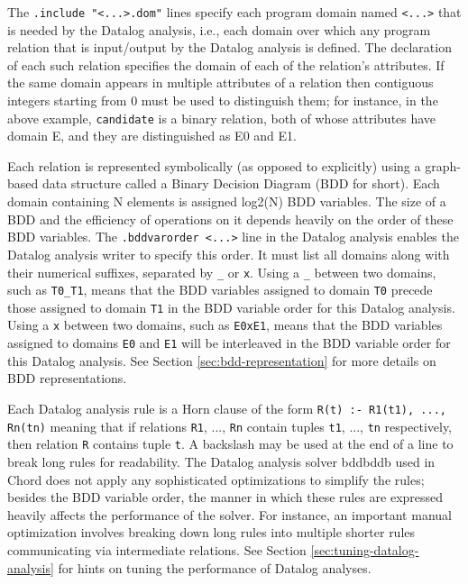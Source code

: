 The {\tt .include "<...>.dom"} lines specify each program domain named
{\tt <...>} that is needed by the Datalog analysis, i.e., each domain over which
any program relation that is input/output by the Datalog analysis is defined. 
The declaration of each such relation specifies the domain of each of the relation's attributes.
If the same domain appears in multiple attributes of a relation then
contiguous integers starting from 0 must be used to distinguish them; for instance,
in the above example, {\tt candidate} is a binary relation, both of whose
attributes have domain E, and they are distinguished as E0 and E1.

Each relation is represented symbolically (as opposed to explicitly)
using a graph-based data structure called a Binary Decision Diagram (BDD for short).
Each domain containing N elements is assigned log2(N) BDD variables.
The size of a BDD and the efficiency of operations on it depends heavily
on the order of these BDD variables.
The {\tt .bddvarorder <...>} line in the Datalog analysis enables the Datalog
analysis writer to specify this order.
It must list all domains along with their numerical suffixes, separated
by {\tt \_} or {\tt x}.
Using a {\tt \_} between two domains, such as {\tt T0\_T1}, means that the BDD variables assigned
to domain {\tt T0} precede those assigned to domain {\tt T1} in the BDD variable
order for this Datalog analysis.
Using a {\tt x} between two domains, such as {\tt E0xE1}, means that the
BDD variables assigned to domains {\tt E0} and {\tt E1}
will be interleaved in the BDD variable order for this Datalog analysis.
See Section \ref{sec:bdd-representation} for more details on BDD representations.

Each Datalog analysis rule is a Horn clause of the form
{\tt R(t) :- R1(t1), ..., Rn(tn)}
meaning that if relations {\tt R1}, ..., {\tt Rn} contain tuples {\tt t1}, ..., {\tt tn}
respectively, then relation {\tt R} contains tuple {\tt t}.
A backslash may be used at the end of a line to break long rules for readability.
The Datalog analysis solver bddbddb used in Chord does not apply any
sophisticated optimizations to simplify the rules; besides the BDD variable order,
the manner in which these rules are expressed heavily affects the performance of
the solver.  For instance, an important manual optimization involves breaking down
long rules into multiple shorter rules communicating via intermediate relations.
See Section \ref{sec:tuning-datalog-analysis} for hints on tuning the performance
of Datalog analyses.
